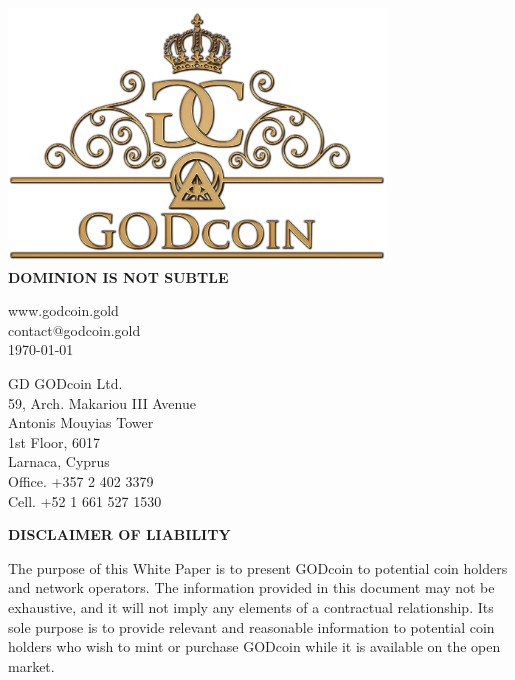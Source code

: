 \documentclass[12pt,a4paper]{article}
\begin{document}
  \begin{center}
    \includegraphics[width=100mm]{logo.png}\\
    \Large{\textbf{DOMINION IS NOT SUBTLE}}\\
    \vspace{3mm}

    \vspace{3mm}
    \normalsize{www.godcoin.gold}\\
    \normalsize{contact@godcoin.gold}\\
    \normalsize{\today}
    \vspace{5mm}

    \normalsize{GD GODcoin Ltd.}\\
    \normalsize{59, Arch. Makariou III Avenue}\\
    \normalsize{Antonis Mouyias Tower}\\
    \normalsize{1st Floor, 6017}\\
    \normalsize{Larnaca, Cyprus}\\
    \normalsize{Office. +357 2 402 3379}\\
    \normalsize{Cell. +52 1 661 527 1530}\\
  \end{center}

  \newpage
  \begin{center}
    \textbf{DISCLAIMER OF LIABILITY}
  \end{center}
  The purpose of this White Paper is to present GODcoin to potential coin
  holders and network operators. The information provided in this document may
  not be exhaustive, and it will not imply any elements of a contractual
  relationship. Its sole purpose is to provide relevant and reasonable
  information to potential coin holders who wish to mint or purchase GODcoin
  while it is available on the open market.\\
\end{document}
